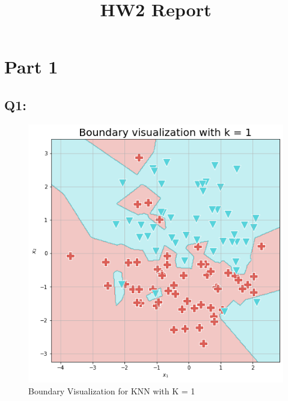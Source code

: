 \documentclass{article}
\title{HW2 Report}
\date{}
\begin{document}
\maketitle
\section*{Part 1}
\subsection*{Q1:}
    \begin{figure}[H]
        \centering
        \includegraphics[scale=0.4]{q1_k1.png}
        \caption{Boundary Visualization for KNN with K = 1}
        \label{fig:q1_k1}
    \end{figure}
\end{document}
